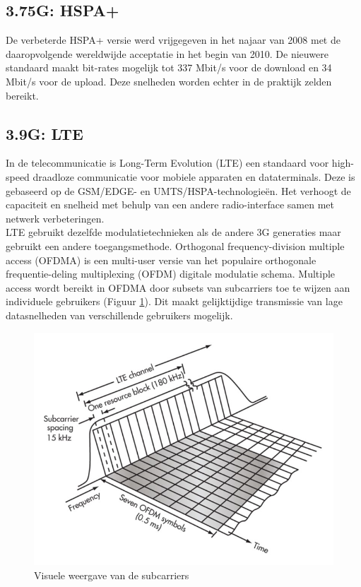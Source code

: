 \documentclass{article}
\begin{document}
\subsection{3.75G: HSPA+}
De verbeterde HSPA+ versie werd vrijgegeven in het najaar van 2008 met de daaropvolgende wereldwijde acceptatie in het begin van 2010. De nieuwere standaard maakt bit-rates mogelijk tot 337 Mbit/s voor de download en 34 Mbit/s voor de upload. Deze snelheden worden echter in de praktijk zelden bereikt. \cite{3g}

\subsection{3.9G: LTE} \label{ssec:lte}
In de telecommunicatie is Long-Term Evolution (LTE) een standaard voor high-speed draadloze communicatie voor mobiele apparaten en dataterminals. Deze is gebaseerd op de GSM/EDGE- en UMTS/HSPA-technologieën. Het verhoogt de capaciteit en snelheid met behulp van een andere radio-interface samen met netwerk verbeteringen.\\

\noindent LTE gebruikt dezelfde modulatietechnieken als de andere 3G generaties maar gebruikt een andere toegangsmethode. Orthogonal frequency-division multiple access (OFDMA) is een multi-user versie van het populaire orthogonale frequentie-deling multiplexing (OFDM) digitale modulatie schema. Multiple access wordt bereikt in OFDMA door subsets van subcarriers toe te wijzen aan individuele gebruikers (Figuur \ref{fig:ofdm}). Dit maakt gelijktijdige transmissie van lage datasnelheden van verschillende gebruikers mogelijk.
\cite{FDMA} \cite{3g}

\begin{figure}[H]
\centering
\includegraphics[width=0.85 \textwidth]{img/ofdm.jpg}
\caption{Visuele weergave van de subcarriers}
\label{fig:ofdm}
\end{figure}
\end{document}
